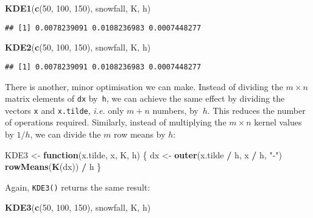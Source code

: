 \documentclass[
  a4paper,
]{article}
\newenvironment{Shaded}{\begin{snugshade}}{\end{snugshade}}
\newcommand{\ControlFlowTok}[1]{\textcolor[rgb]{0.13,0.29,0.53}{\textbf{#1}}}
\newcommand{\DecValTok}[1]{\textcolor[rgb]{0.00,0.00,0.81}{#1}}
\newcommand{\FunctionTok}[1]{\textcolor[rgb]{0.13,0.29,0.53}{\textbf{#1}}}
\newcommand{\NormalTok}[1]{#1}
\newcommand{\OtherTok}[1]{\textcolor[rgb]{0.56,0.35,0.01}{#1}}
\newcommand{\SpecialCharTok}[1]{\textcolor[rgb]{0.81,0.36,0.00}{\textbf{#1}}}
\newcommand{\StringTok}[1]{\textcolor[rgb]{0.31,0.60,0.02}{#1}}
\theoremstyle{definition}
\theoremstyle{definition}
\theoremstyle{definition}
\theoremstyle{definition}
\theoremstyle{remark}
\begin{document}
\begin{Shaded}
\begin{Highlighting}[]
\FunctionTok{KDE1}\NormalTok{(}\FunctionTok{c}\NormalTok{(}\DecValTok{50}\NormalTok{, }\DecValTok{100}\NormalTok{, }\DecValTok{150}\NormalTok{), snowfall, K, h)}
\end{Highlighting}
\end{Shaded}

\begin{verbatim}
## [1] 0.0078239091 0.0108236983 0.0007448277
\end{verbatim}

\begin{Shaded}
\begin{Highlighting}[]
\FunctionTok{KDE2}\NormalTok{(}\FunctionTok{c}\NormalTok{(}\DecValTok{50}\NormalTok{, }\DecValTok{100}\NormalTok{, }\DecValTok{150}\NormalTok{), snowfall, K, h)}
\end{Highlighting}
\end{Shaded}

\begin{verbatim}
## [1] 0.0078239091 0.0108236983 0.0007448277
\end{verbatim}

There is another, minor optimisation we can make. Instead of dividing the
\(m\times n\) matrix elements of \texttt{dx} by~\texttt{h}, we can achieve the same effect by
dividing the vectors \texttt{x} and \texttt{x.tilde}, \emph{i.e.} only \(m+n\) numbers, by~\(h\).
This reduces the number of operations required. Similarly, instead of
multiplying the \(m\times n\) kernel values by \(1/h\), we can divide the \(m\) row
means by \(h\):

\begin{Shaded}
\begin{Highlighting}[]
\NormalTok{KDE3 }\OtherTok{\textless{}{-}} \ControlFlowTok{function}\NormalTok{(x.tilde, x, K, h) \{}
\NormalTok{  dx }\OtherTok{\textless{}{-}} \FunctionTok{outer}\NormalTok{(x.tilde }\SpecialCharTok{/}\NormalTok{ h, x }\SpecialCharTok{/}\NormalTok{ h, }\StringTok{"{-}"}\NormalTok{)}
  \FunctionTok{rowMeans}\NormalTok{(}\FunctionTok{K}\NormalTok{(dx)) }\SpecialCharTok{/}\NormalTok{ h}
\NormalTok{\}}
\end{Highlighting}
\end{Shaded}

Again, \texttt{KDE3()} returns the same result:

\begin{Shaded}
\begin{Highlighting}[]
\FunctionTok{KDE3}\NormalTok{(}\FunctionTok{c}\NormalTok{(}\DecValTok{50}\NormalTok{, }\DecValTok{100}\NormalTok{, }\DecValTok{150}\NormalTok{), snowfall, K, h)}
\end{Highlighting}
\end{Shaded}
\end{document}
